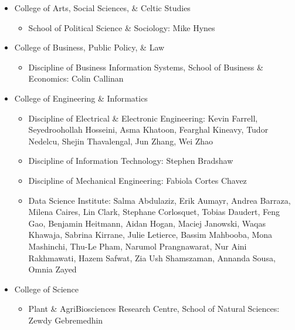 \documentclass[10pt,a4paper]{res} %
\begin{document}
\begin{resume}
\begin{itemize} \itemsep -2pt
\item College of Arts, Social Sciences, \& Celtic Studies
\begin{itemize}
\item School of Political Science \& Sociology: Mike Hynes
\end{itemize}
\item College of Business, Public Policy, \& Law
\begin{itemize}
\item Discipline of Business Information Systems, School of Business \& Economics: Colin Callinan
\end{itemize}
\item College of Engineering \& Informatics
\begin{itemize}
\item Discipline of Electrical \& Electronic Engineering: Kevin Farrell, Seyedroohollah Hosseini, Asma Khatoon, Fearghal Kineavy, Tudor Nedelcu, Shejin Thavalengal, Jun Zhang, Wei Zhao
\item Discipline of Information Technology: Stephen Bradshaw
\item Discipline of Mechanical Engineering: Fabiola Cortes Chavez
\item Data Science Institute: Salma Abdulaziz, Erik Aumayr, Andrea Barraza, Milena Caires, Lin Clark, Stephane Corlosquet, Tobias Daudert, Feng Gao, Benjamin Heitmann, Aidan Hogan, Maciej Janowski, Waqas Khawaja, Sabrina Kirrane, Julie Letierce, Bassim Mahbooba, Mona Mashinchi, Thu-Le Pham, Narumol Prangnawarat, Nur Aini Rakhmawati, Hazem Safwat, Zia Ush Shamszaman, Annanda Sousa, Omnia Zayed
\end{itemize}
\item College of Science
\begin{itemize}
\item Plant \& AgriBiosciences Research Centre, School of Natural Sciences: Zewdy Gebremedhin
\end{itemize}
\end{itemize}


\vspace{0.2in} %



\end{resume}
\end{document}
